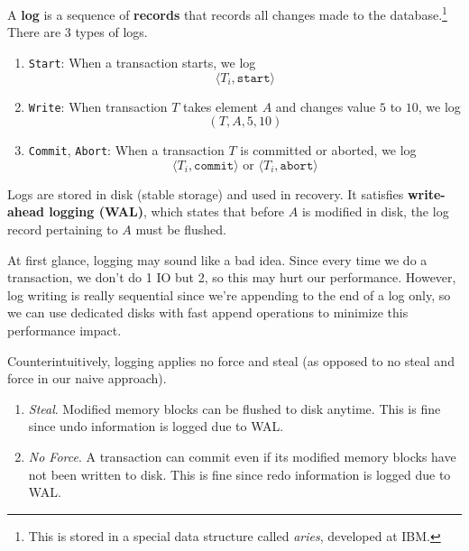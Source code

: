 \documentclass{article}
\begin{document}
      \begin{definition}[Log]
        A \textbf{log} is a sequence of \textbf{records} that records all changes made to the database.\footnote{This is stored in a special data structure called \textit{aries}, developed at IBM.} There are 3 types of logs.
        \begin{enumerate}
          \item \texttt{Start}: When a transaction starts, we log 
            \begin{equation}
              \langle T_i, \texttt{start} \rangle
            \end{equation}
          \item \texttt{Write}: When transaction $T$ takes element $A$ and changes value $5$ to $10$, we log 
            \begin{equation}
              (T, A, 5, 10)
            \end{equation}
          \item \texttt{Commit}, \texttt{Abort}: When a transaction $T$ is committed or aborted, we log 
            \begin{equation}
              \langle T_i , \texttt{commit} \rangle \text{ or } \langle T_i , \texttt{abort} \rangle
            \end{equation}
        \end{enumerate}
        Logs are stored in disk (stable storage) and used in recovery. 
        It satisfies \textbf{write-ahead logging (WAL)}, which states that before $A$ is modified in disk, the log record pertaining to $A$ must be flushed. 
      \end{definition}

      At first glance, logging may sound like a bad idea. Since every time we do a transaction, we don't do 1 IO but 2, so this may hurt our performance. However, log writing is really sequential since we're appending to the end of a log only, so we can use dedicated disks with fast append operations to minimize this performance impact. 

      \begin{theorem}
        Counterintuitively, logging applies no force and steal (as opposed to no steal and force in our naive approach). 
        \begin{enumerate}
          \item \textit{Steal}. Modified memory blocks can be flushed to disk anytime. This is fine since undo information is logged due to WAL. 
          \item \textit{No Force}. A transaction can commit even if its modified memory blocks have not been written to disk. This is fine since redo information is logged due to WAL. 
        \end{enumerate}
      \end{theorem} 
\end{document}
